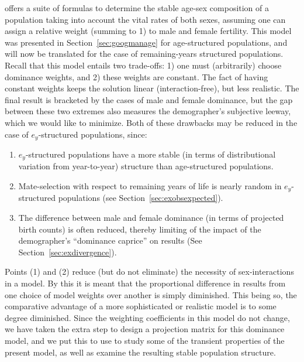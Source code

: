  \FloatBarrier
 \label{sec:ex2sexdomweights}
\citet{goodman1967age} offers a suite of
formulas to determine the stable age-sex composition of a population taking into
account the vital rates of both sexes, assuming one can assign a relative weight
(summing to 1) to male and female fertility. This model was presented in
Section~\ref{sec:googmanage} for age-structured populations, and will now be
translated for the case of remaining-years structured populations. Recall that
this model entails two trade-offs: 1) one must (arbitrarily) choose dominance
weights, and 2) these weights are constant. The fact of having constant weights 
keeps the solution linear (interaction-free), but less realistic. The final result is bracketed by the
cases of male and female dominance, but the gap between these two extremes 
also measures the demographer's subjective leeway, which we would like to
minimize. Both of these drawbacks may be reduced in the case of $e_y$-structured
populations, since: 
\begin{enumerate}
  \item $e_y$-structured populations have a more stable (in terms of
  distributional variation from year-to-year) structure than age-structured
  populations.
  \item Mate-selection with respect to remaining years of
life is nearly random in $e_y$-structured populations (see
Section~\ref{sec:exobsexpected}).
  \item The difference between male and female dominance (in terms of projected
birth counts) is often reduced, thereby limiting of the impact of the
demographer's ``dominance caprice'' on results (See
Section~\ref{sec:exdivergence}).
\end{enumerate}
Points (1) and (2) reduce (but do
not eliminate) the necessity of sex-interactions in a model. By this it is meant
that the proportional difference in results from one choice of model weights
over another is simply diminished. This being so, the comparative advantage of a
more sophisticated or realistic model is to some degree diminished. Since the
weighting coefficients in this model do not change, we have taken the extra step
to design a projection matrix for this dominance model, and we put this to use
to study some of the transient properties of the present model, as well as
examine the resulting stable population structure.
